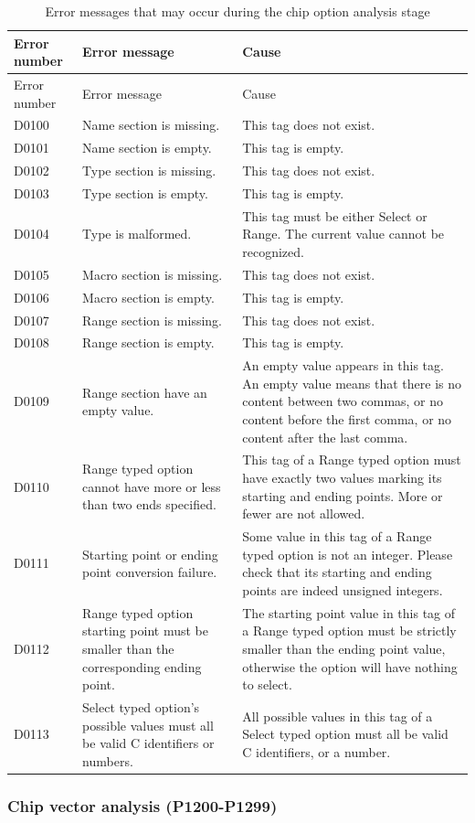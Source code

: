 \begin{xltabular}{\textwidth}{@{}>{\hsize\raggedright\arraybackslash}X>{\hsize\raggedright\arraybackslash}X>{\hsize\raggedright\arraybackslash}X@{}}
\caption{Error messages that may occur during the chip option analysis stage}\label{tab:5-18}\\
\toprule
Error number & Error message & Cause\tabularnewline
\endfirsthead
\toprule
Error number & Error message & Cause\tabularnewline
\midrule
\endhead
\bottomrule
\endlastfoot
D0100 & Name section is missing. & This tag does not exist.\tabularnewline
D0101 & Name section is empty. & This tag is empty.\tabularnewline
D0102 & Type section is missing. & This tag does not exist.\tabularnewline
D0103 & Type section is empty. & This tag is empty.\tabularnewline
D0104 & Type is malformed. & This tag must be either Select or Range. The current value cannot be recognized.\tabularnewline
D0105 & Macro section is missing. & This tag does not exist.\tabularnewline
D0106 & Macro section is empty. & This tag is empty.\tabularnewline
D0107 & Range section is missing. & This tag does not exist.\tabularnewline
D0108 & Range section is empty. & This tag is empty.\tabularnewline
D0109 & Range section have an empty value. & An empty value appears in this tag. An empty value means that there is no content between two commas, or no content before the first comma, or no content after the last comma.\tabularnewline
D0110 & Range typed option cannot have more or less than two ends
specified. & This tag of a Range typed option must have exactly two values marking its starting and ending points. More or fewer are not allowed.\tabularnewline
D0111 & Starting point or ending point conversion failure. &
Some value in this tag of a Range typed option is not an integer. Please check that its starting and ending points are indeed unsigned integers.\tabularnewline
D0112 & Range typed option starting point must be smaller than the
corresponding ending point. & The starting point value in this tag of a Range typed option must be strictly smaller than the ending point value, otherwise the option will have nothing to select.\tabularnewline
D0113 & Select typed option's possible values must all be valid C
identifiers or numbers. & All possible values in this tag of a Select typed option must all be valid C identifiers, or a number.\tabularnewline
\end{xltabular}

\subsubsection{Chip vector analysis (P1200-P1299)}\label{subsubsec:5-6-3-4}

